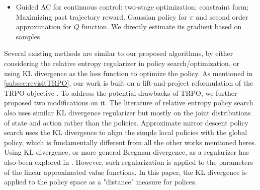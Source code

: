 \begin{itemize}
	\item Guided AC for continuous control: two-stage optimization; constraint form; Maximizing past trajectory reward. Gaussian policy for $\pi$ and second order approximation for $Q$ function. We directly estimate its gradient based on samples. \citep{tangkaratt2017guide}
\end{itemize}






Several existing methods are similar to our proposed algorithms,
by either considering the relative entropy regularizer in policy search/optimization, or using KL divergence as the loss function to optimize the policy. 
As mentioned in \cref{subsec:revisitTRPO}, 
our work is built on a lift-and-project reformulation of the TRPO objective \citep{schulman2015trust}. 
To address the potential drawbacks of TRPO, we further proposed two modifications on it. 
The literature of relative entropy policy search also uses similar KL divergence regularizer \citep{peters2010relative,van2015learning} but mostly on the joint distributions of state and action rather than the policies. 
Approximate mirror descent policy search \citep{montgomery2016guided} uses the KL divergence to align the simple local policies with the global policy, which is fundamentally different from all the other works mentioned heres.
Using KL divergence, or more general Bregman divergence, as a regularizer has also been explored  in \citet{liu2015finite,thomas2013projected,mahadevan2012sparse}. 
However, such regularization is applied to the parameters of the  linear approximated value functions. In this paper, the KL divergence is applied to the policy space as a "distance" measure for polices. 


